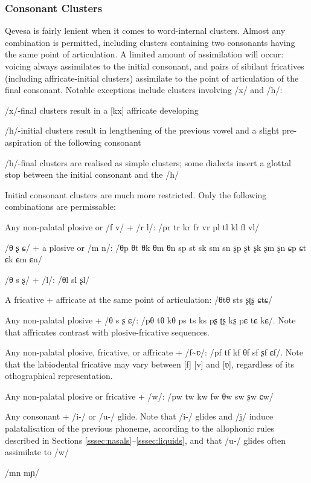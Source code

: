 \documentclass[grammar]{subfiles}
\begin{document}
	\subsubsection{Consonant Clusters}
	\label{sssec:consonant_clusters}

	Qevesa is fairly lenient when it comes to word-internal clusters. Almost any combination is permitted, including clusters containing two consonants having the same point of articulation. A limited amount of assimilation will occur: voicing always assimilates to the initial consonant, and pairs of sibilant fricatives (including affricate-initial clusters) assimilate to the point of articulation of the final consonant. Notable exceptions include clusters involving /x/ and /h/: 

	\begin{itemize*}
	\item /x/-final clusters result in a [kx] affricate developing
	\item /h/-initial clusters result in lengthening of the previous vowel and a slight pre-aspiration of the following consonant
	\item /h/-final clusters are realised as simple clusters; some dialects insert a glottal stop between the initial consonant and the /h/
	\end{itemize*}

	Initial consonant clusters are much more restricted. Only the following combinations are permissable:

	\begin{itemize*}
	\item Any non-palatal plosive or /f v/ + /r l/: /pr tr kr fr vr pl tl kl fl vl/ 
	\item /θ ʂ ɕ/ + a plosive or /m n/: /θp θt θk θm θn sp st sk sm sn ʂp ʂt ʂk ʂm ʂn ɕp ɕt ɕk ɕm ɕn/
	\item /θ s ʂ/ + /l/: /θl sl ʂl/
	\item A fricative + affricate at the same point of articulation: /θtθ sts ʂʈʂ ɕtɕ/
	\item Any non-palatal plosive + /θ s ʂ ɕ/: /pθ tθ kθ ps ts ks pʂ ʈʂ kʂ pɕ tɕ kɕ/. Note that affricates contrast with plosive-fricative sequences.
	\item Any non-palatal plosive, fricative, or affricate + /f\textasciitilde ʋ/: /pf tf kf θf sf ʂf ɕf/. Note that the labiodental fricative may vary between [f] [v] and [ʋ], regardless of its othographical representation.
	\item Any non-palatal plosive or fricative + /w/: /pw tw kw fw θw sw ʂw ɕw/
	\item Any consonant + /i-/ or /u-/ glide. Note that /i-/ glides and /j/ induce palatalisation of the previous phoneme, according to the allophonic rules described in Sections \ref{sssec:nasals}–\ref{sssec:liquids}, and that /u-/ glides often assimilate to /w/
	\item /mn mɲ/
	\end{itemize*}
\end{document}
